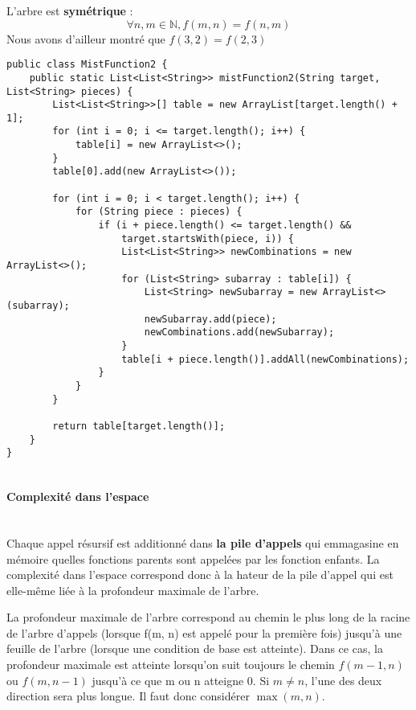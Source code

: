 \documentclass[9pt]{report}
\begin{document}
  \begin{note}{}{}
      L'arbre est \textbf{symétrique} : 
      \[ \forall n, m \in \mathbb{N}, f(m, n) = f(n, m) \]   
      Nous avons d'ailleur montré que $f(3, 2) = f(2, 3)$
  \end{note}        
  \begin{figure*}
   \begin{lstlisting}[style=JavaDraculaWhite]
 public class MistFunction2 {
    public static List<List<String>> mistFunction2(String target, List<String> pieces) {
        List<List<String>>[] table = new ArrayList[target.length() + 1];
        for (int i = 0; i <= target.length(); i++) {
            table[i] = new ArrayList<>();
        }
        table[0].add(new ArrayList<>());

        for (int i = 0; i < target.length(); i++) {
            for (String piece : pieces) {
                if (i + piece.length() <= target.length() &&
                    target.startsWith(piece, i)) {
                    List<List<String>> newCombinations = new ArrayList<>();
                    for (List<String> subarray : table[i]) {
                        List<String> newSubarray = new ArrayList<>(subarray);
                        newSubarray.add(piece);
                        newCombinations.add(newSubarray);
                    }
                    table[i + piece.length()].addAll(newCombinations);
                }
            }
        }

        return table[target.length()];
    }
}
    
  \end{lstlisting}    
  \end{figure*}
  \paragraph{Complexité dans l'espace}
  \mbox{}\\
  Chaque appel résursif est additionné dans 
  \textbf{la pile d'appels} qui emmagasine en mémoire 
  quelles fonctions parents sont appelées par les fonction enfants. 
  La complexité dans l'espace correspond donc à la hateur de la pile d'appel 
  qui est elle-même liée à la profondeur maximale de l'arbre. 


  
  La profondeur maximale de l'arbre correspond 
  au chemin le plus long de la racine de l'arbre d'appels (lorsque f(m, n) 
  est appelé pour la première fois) jusqu'à une feuille de l'arbre 
  (lorsque une condition de base est atteinte). 
  Dans ce cas, la profondeur maximale est atteinte lorsqu'on 
  suit toujours le chemin $f(m - 1, n)  $ou $f(m, n - 1)$ jusqu'à
  ce que m ou n atteigne 0. Si $m \neq n$, l'une des deux direction sera plus longue. 
  Il faut donc considérer $\max(m, n)$. 
\end{document}
